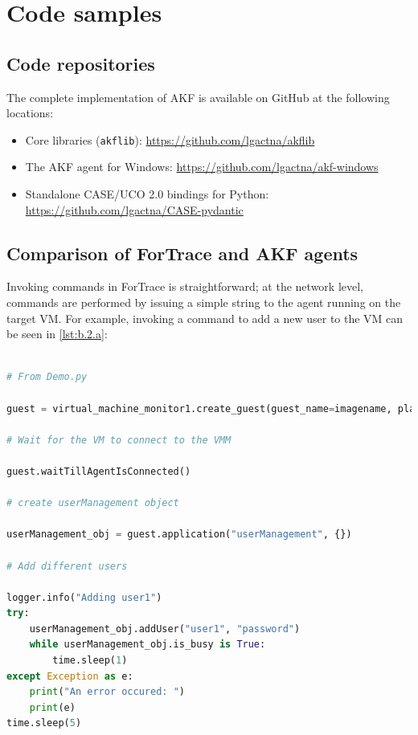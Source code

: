 \documentclass[letterpaper,12pt]{report}
\def\tightlist{}
\newcommand{\passthrough}[1]{#1}
\begin{document}
\chapter{Code samples}\label{appendix-b}

\section{Code repositories}\label{code-repositories}

The complete implementation of AKF is available on GitHub at the
following locations:

\begin{itemize}
\tightlist
\item
  Core libraries (\passthrough{\lstinline!akflib!}):
  \url{https://github.com/lgactna/akflib}
\item
  The AKF agent for Windows:
  \url{https://github.com/lgactna/akf-windows}
\item
  Standalone CASE/UCO 2.0 bindings for Python:
  \url{https://github.com/lgactna/CASE-pydantic}
\end{itemize}

\section{Comparison of ForTrace and AKF
agents}\label{comparison-of-fortrace-and-akf-agents}

Invoking commands in ForTrace
\cite{gobelForTraceHolisticForensic2022} is straightforward; at the
network level, commands are performed by issuing a simple string to the
agent running on the target VM. For example, invoking a command to add a
new user to the VM can be seen in \autoref{lst:b.2.a}:

\begin{lstlisting}[label={lst:b.2.a}, caption={Creating a new user through ForTrace agent commands}, language=Python]

# From Demo.py

guest = virtual_machine_monitor1.create_guest(guest_name=imagename, platform="windows")

# Wait for the VM to connect to the VMM

guest.waitTillAgentIsConnected()

# create userManagement object

userManagement_obj = guest.application("userManagement", {})

# Add different users

logger.info("Adding user1")
try:
    userManagement_obj.addUser("user1", "password")
    while userManagement_obj.is_busy is True:
        time.sleep(1)
except Exception as e:
    print("An error occured: ")
    print(e)
time.sleep(5)
\end{lstlisting}
\end{document}
